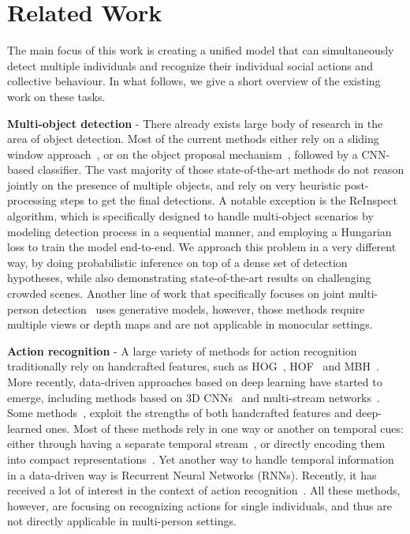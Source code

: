 \documentclass[10pt,twocolumn,letterpaper]{article}
\begin{document}
\section{Related Work}
\vspace{-0.15cm}
\label{sec:related}
The main focus of this work is creating a unified model that can
simultaneously detect multiple individuals and recognize their
individual social actions and collective behaviour. 
In what follows, we give a short overview of the existing work on these tasks. 

\noindent \textbf{Multi-object detection} - There already exists large body of 
research in the area of object detection. Most of the current methods either 
rely on a sliding window approach~\cite{Sermanet2013,Zhang2015}, or on the object proposal
mechanism~\cite{Girshick2015,Ren2015}, followed by a CNN-based classifier. The
vast majority of those state-of-the-art methods do not reason jointly on the
presence of multiple objects, and rely on very heuristic post-processing
steps to get the final detections. A notable exception is the
ReInspect~\cite{Stewart2016} algorithm, which is specifically designed to handle
multi-object scenarios by modeling detection process in a sequential manner,
and employing a Hungarian loss to train the model end-to-end. We approach this
problem in a very different way, by doing probabilistic inference on top of 
a dense set of detection hypotheses, while also demonstrating state-of-the-art 
results on challenging crowded scenes. Another line of work that specifically 
focuses on joint multi-person detection~\cite{Fleuret2008, Bagautdinov2015} uses
generative models, however, those methods require multiple views or depth maps 
and are not applicable in monocular settings.

\noindent \textbf{Action recognition} - A large variety of methods for action
recognition traditionally rely on handcrafted features, such as
HOG~\cite{Dalal2005,Weinland10}, HOF~\cite{Laptev2008} and MBH~\cite{Wang2013}. 
More recently, data-driven approaches based on deep learning have
started to emerge, including methods based on 3D CNNs~\cite{Ji2013} and multi-stream
networks~\cite{Feichtenhofer2016,Singh2016a}. Some
methods~\cite{Wang2015,Singh2016b}, exploit the strengths of both handcrafted
features and deep-learned ones. Most of these methods rely in one way or
another on temporal cues: either through having a separate temporal
stream~\cite{Feichtenhofer2016, Singh2016b}, or directly encoding them into
compact representations~\cite{Laptev2008,Wang2013,Wang2013}. Yet another way to
handle temporal information in a data-driven way is Recurrent Neural Networks (RNNs).
Recently, it has received a lot of interest in the context of action
recognition~\cite{Singh2016a,Du2015,Veeriah2015,Donahue2015}. All these methods,
however, are focusing on recognizing actions for single individuals, and thus
are not directly applicable in multi-person settings.
\end{document}
